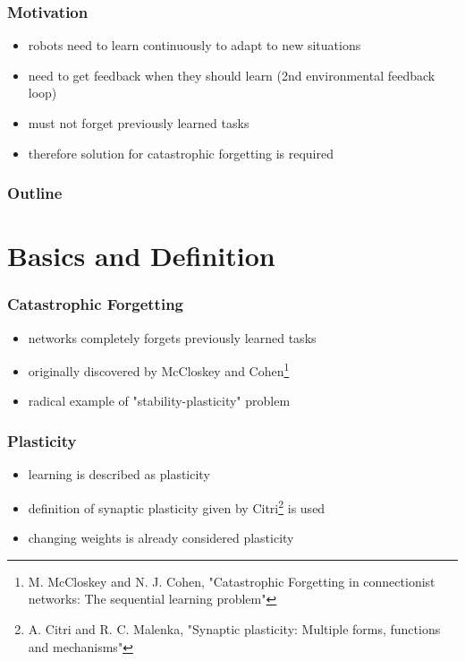 \documentclass[14pt]{beamer}
\institute{Universit\"at Hamburg\\\trinstitute}
\title{\trtitle}
\subtitle{\trtype}
\author{\trauthor}
\date{}
\theoremstyle{remark}
\begin{document}
\renewcommand{\arraystretch}{1.2}

\begin{frame}[plain] %
  \titlepage
\end{frame}

\begin{frame}[t]
    \frametitle{Motivation}
    \begin{itemize}
  	    \item robots need to learn continuously to adapt to new situations
        \vfill
        \item need to get feedback when they should learn (2nd environmental
              feedback loop)
        \vfill
        \item must not forget previously learned tasks
        \vfill
        \item therefore solution for catastrophic forgetting is required
	\end{itemize}
\end{frame}

\begin{frame}
    \frametitle{Outline}
	\tableofcontents
\end{frame}


\section{Basics and Definition}

\begin{frame}[t]
    \frametitle{Catastrophic Forgetting}
    \begin{itemize}
  	    \item networks completely forgets previously learned tasks
        \vfill
        \item originally discovered by McCloskey and
              Cohen\footnote{M. McCloskey and N. J. Cohen,
              "Catastrophic Forgetting in connectionist networks: The sequential
              learning problem"\cite{McCloskey1989}}
        \vfill
        \item radical example of "stability-plasticity" problem\cite{Grossberg1982}
	\end{itemize}
\end{frame}

\begin{frame}[t]
    \frametitle{Plasticity}
    \begin{itemize}
  	    \item learning is described as plasticity
        \vfill
        \item definition of synaptic plasticity given by
        Citri\footnote{A. Citri and R. C. Malenka, "Synaptic plasticity:
        Multiple forms, functions and mechanisms"\cite{Citri2008}} is used
        \vfill
        \item changing weights is already considered plasticity
	\end{itemize}
\end{frame}
\end{document}
